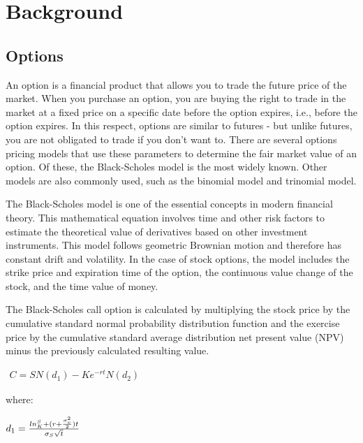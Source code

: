 \documentclass[10pt]{article}
\theoremstyle{definition}
\begin{document}
\section{Background}
\subsection{Options}

An option is a financial product that allows you to trade the future price of the market. When you purchase an option, you are buying the right to trade in the market at a fixed price on a specific date before the option expires, i.e., before the option expires. In this respect, options are similar to futures - but unlike futures, you are not obligated to trade if you don't want to. There are several options pricing models that use these parameters to determine the fair market value of an option. Of these, the Black-Scholes model \citep{Black1973May} is the most widely known. Other models are also commonly used, such as the binomial model and trinomial model.


The Black-Scholes model is one of the essential concepts in modern financial theory. This mathematical equation involves time and other risk factors to estimate the theoretical value of derivatives based on other investment instruments. This model follows geometric Brownian motion and therefore has constant drift and volatility. In the case of stock options, the model includes the strike price and expiration time of the option, the continuous value change of the stock, and the time value of money.

The Black-Scholes call option is calculated by multiplying the stock price by the cumulative standard normal probability distribution function and the exercise price by the cumulative standard average distribution net present value (NPV) minus the previously calculated resulting value.

\begin{center} 
$
\begin{matrix}
C=SN (d_1)-Ke^{-rt}N (d_2)
\end{matrix}
$
\end{center}

where:

\begin{center} 
$
\begin{matrix}
d_1 = {{ln^{S}_K+(r+{\sigma^{2}_v \over2} )t} \over \sigma_S \sqrt t}
\end{matrix}
$
\end{center}
\end{document}
